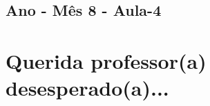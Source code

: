\begin{multicols}{2}
\section[\sffamily 5\textordmasculine\space Ano - Mês 8 - Aula-4]{\textordmasculine\space Ano - Mês 8 - Aula-4}


\end{multicols}


\chapter[ Querida professor(a) desesperado(a)...]{Querida professor(a) desesperado(a)...}



